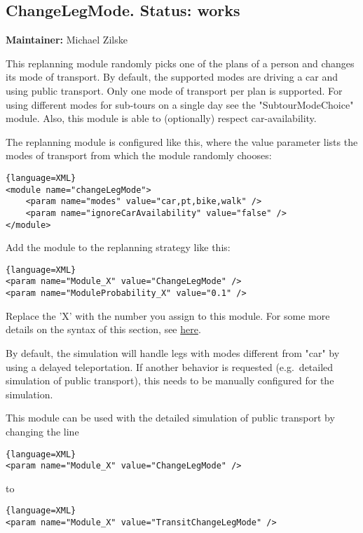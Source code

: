 \subsection{ChangeLegMode. Status: works}
\label{sec:changeLegMode}

\textbf{Maintainer:} Michael Zilske

This replanning module randomly picks one of the plans of a person  and changes its mode of transport. By default, the supported modes  are driving a car and using public transport. Only one mode of transport  per plan is supported. For using different modes for sub-tours on a  single day see the "SubtourModeChoice" module. Also, this module is able  to (optionally) respect car-availability.

The replanning module is configured like this, where the value  parameter lists the modes of transport from which the module randomly  chooses:
\begin{lstlisting}{language=XML}
<module name="changeLegMode">
    <param name="modes" value="car,pt,bike,walk" />
    <param name="ignoreCarAvailability" value="false" />
</module>
\end{lstlisting}

Add the module to the replanning strategy like this:
\begin{lstlisting}{language=XML}
<param name="Module_X" value="ChangeLegMode" />
<param name="ModuleProbability_X" value="0.1" />
\end{lstlisting}

Replace the 'X' with the number you assign to this module. For some more details on the syntax of this section, see \href{http://matsim.org/node/478}{here}.

By default, the simulation will handle legs with modes different from  "car" by using a delayed teleportation. If another behavior is  requested (e.g.\ detailed simulation of public transport), this needs to  be manually configured for the simulation.

This module can be used with the detailed simulation of public transport by changing the line

\begin{lstlisting}{language=XML}
<param name="Module_X" value="ChangeLegMode" />
\end{lstlisting}

to

\begin{lstlisting}{language=XML}
<param name="Module_X" value="TransitChangeLegMode" />
\end{lstlisting}

